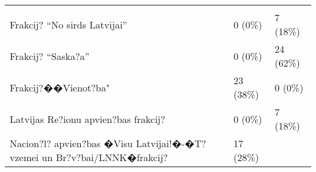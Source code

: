 \documentclass[
]{article}
\begin{document}
\begin{longtable}[]{@{}lll@{}}
\begin{minipage}[t]{0.17\columnwidth}
\strut
\end{minipage}\tabularnewline
\begin{minipage}[t]{0.57\columnwidth}\raggedright
Frakcij? ``No sirds Latvijai''\strut
\end{minipage} & \begin{minipage}[t]{0.18\columnwidth}\raggedright
0 (0\%)\strut
\end{minipage} & \begin{minipage}[t]{0.17\columnwidth}\raggedright
7 (18\%)\strut
\end{minipage}\tabularnewline
\begin{minipage}[t]{0.57\columnwidth}\raggedright
Frakcij? ``Saska?a''\strut
\end{minipage} & \begin{minipage}[t]{0.18\columnwidth}\raggedright
0 (0\%)\strut
\end{minipage} & \begin{minipage}[t]{0.17\columnwidth}\raggedright
24 (62\%)\strut
\end{minipage}\tabularnewline
\begin{minipage}[t]{0.57\columnwidth}\raggedright
Frakcij?��Vienot?ba"\strut
\end{minipage} & \begin{minipage}[t]{0.18\columnwidth}\raggedright
23 (38\%)\strut
\end{minipage} & \begin{minipage}[t]{0.17\columnwidth}\raggedright
0 (0\%)\strut
\end{minipage}\tabularnewline
\begin{minipage}[t]{0.57\columnwidth}\raggedright
Latvijas Re?ionu apvien?bas frakcij?\strut
\end{minipage} & \begin{minipage}[t]{0.18\columnwidth}\raggedright
0 (0\%)\strut
\end{minipage} & \begin{minipage}[t]{0.17\columnwidth}\raggedright
7 (18\%)\strut
\end{minipage}\tabularnewline
\begin{minipage}[t]{0.57\columnwidth}\raggedright
Nacion?l? apvien?bas �Visu Latvijai!�-�T?vzemei un
Br?v?bai/LNNK�frakcij?\strut
\end{minipage} & \begin{minipage}[t]{0.18\columnwidth}\raggedright
17 (28\%)\strut
\end{minipage} & \begin{minipage}[t]{0.17\columnwidth}\raggedright

\end{minipage}
\end{longtable}
\end{document}
